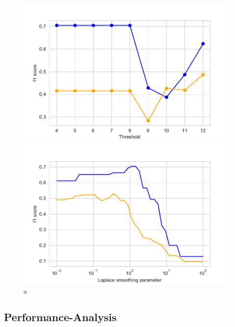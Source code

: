 \documentclass[11pt]{article}
\begin{document}
%
%
\begin{figure}[h]
\begin{minipage}[l]{0.5\textwidth}
\includegraphics[width=1\linewidth]{bridges/thresholds_nb.pdf}
\end{minipage}
\begin{minipage}[l]{0.5\textwidth}
\includegraphics[width=1\linewidth]{bridges/laplace_nb.pdf}
\end{minipage}
\caption{a}
\label{Fig:: NB_result_manual parameter_tuning}
\end{figure}

\subsection{Performance-Analysis}
\end{document}
